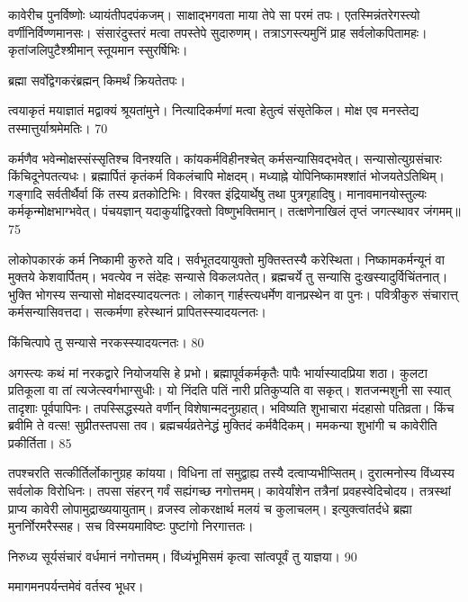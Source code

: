 कावेरीच पुनर्विष्णोः ध्यायंतीपदपंकजम्।
साक्षाद्भगवता माया तेपे सा परमं तपः।
एतस्मिन्नंतरेगस्त्यो वर्णीनिर्विण्णमानसः।
संसारंदुस्तरं मत्वा तपस्तेपे सुदारुणम्।
तत्राऽगस्त्यमुनिं प्राह सर्वलोकपितामहः।
कृतांजलिपुटैश्श्रीमान् स्तूयमान स्सुरर्षिभिः।

ब्रह्मा
सर्वोद्वेगकरंब्रह्मन् किमर्थं क्रियतेतपः।

त्वयाकृतं मयाज्ञातं मद्वाक्यं श्रूयतांमुने।
नित्यादिकर्मणां मत्वा हेतुत्वं संसृतेकिल।
मोक्ष एव मनस्तेद्य तस्मात्तुर्याश्रमेमतिः।
70

कर्मणैव भवेन्मोक्षस्संस्सृतिश्च विनश्यति।
कांयकर्मविहीनश्चेत् कर्मसन्यासिवद्भवेत्।
सन्यासोत्युग्रसंचारः किंचिदूनेपतत्यधः।
ब्रह्मार्पितं कृतंकर्म विकलंचापि मोक्षदम्।
मध्याह्ने योपिनिष्कामश्शांतं भोजयतेऽतिथिम्।
गङ्गादि सर्वतीर्थैर्वा किं तस्य व्रतकोटिभिः।
विरक्त इंद्रियार्थेषु तथा पुत्रगृहादिषु।
मानावमानयोस्तुल्यः कर्मकृन्मोक्षभाग्भवेत्।
पंचयज्ञान् यदाकुर्याद्विरक्तो विष्णुभक्तिमान्।
तत्क्षणेनाखिलं तृप्तं जगत्स्थावर जंगमम्॥75

लोकोपकारकं कर्म निष्कामी कुरुते यदि।
सर्वभूतदयायुक्तो मुक्तिस्तस्यै करेस्थिता।
निष्कामकर्मन्यूनं वा मुक्तये केशवार्पितम्।
भवत्येव न संदेहः सन्यासे विकलःपतेत्।
ब्रह्मचर्ये तु सन्यासि दुःखस्यादुर्विचिंतनात्।
भुक्ति भोगस्य सन्यासो मोक्षदस्यादयत्नतः।
लोकान् गार्हस्त्यधर्मेण वानप्रस्थेन वा पुनः।
पवित्रीकुरु संचारात्त् कर्मसन्यासिवत्तदा।
सत्कर्मणा हरेस्थानं प्रापितस्स्यादयत्नतः।

किंचित्पापे तु सन्यासे नरकस्स्यादयत्नतः।
80


अगस्त्यः
कथं मां नरकद्वारे नियोजयसि हे प्रभो।
ब्रह्मापूर्वकर्मकृतैः पापैः भार्यास्यादप्रिया शठा।
कुलटा प्रतिकूला वा तां त्यजेत्स्वर्गभाग्सुधीः।
यो निंदति पतिं नारी प्रतिकुप्यति वा सकृत्।
शतजन्मशुनी सा स्यात् तादृशाः पूर्वपापिनः।
तपस्सिद्धस्यते वर्णीन् विशेषान्मदनुग्रहात्।
भविष्यति शुभाचारा मंदहासो पतिव्रता।
किंच ब्रवीमि ते वत्स! सुप्रीतस्तपसा तव।
ब्रह्मचर्यव्रतेनेद्धं मुक्तिदं कर्मवैदिकम्।
ममकन्या शुभांगी च कावेरीति प्रकीर्तिता।
85

तपश्चरति सत्कीर्तिर्लोकानुग्रह कांयया।
विधिना तां समुद्वाह्य तस्यै दत्वाप्यभीप्सितम्।
दुरात्मनोस्य विंध्यस्य सर्वलोक विरोधिनः।
तपसा संहरन् गर्वं सह्यंगच्छ नगोत्तमम्।
कावेर्यांशेन तत्रैनां प्रवहस्वेदिचोदय।
तत्रस्थां प्राप्य कावेरी लोपामुद्राख्ययायुताम्।
व्रजस्व लोकरक्षार्थ मलयं च कुलाचलम्।
इत्युक्त्वांतर्दधे ब्रह्मा मुनर्नोिरमरैस्सह।
सच विस्मयमाविष्टः पुष्टांगो निरगात्ततः।

निरुध्य सूर्यसंचारं वर्धमानं नगोत्तमम्।
विंध्यंभूमिसमं कृत्वा सांत्वपूर्वं तु याज्ञया।
90

ममागमनपर्यन्तमेवं वर्तस्व भूधर।

